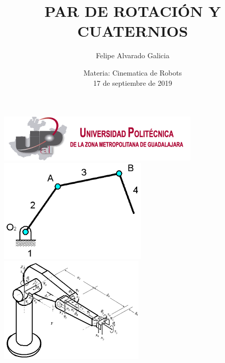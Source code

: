 \documentclass[12pt,a4paper]{article}
\author{Felipe Alvarado Galicia}
\title{PAR DE ROTACIÓN Y CUATERNIOS}
\date{Materia: Cinematica de Robots\\
17 de septiembre de 2019}
\begin{document}
\maketitle \includegraphics[scale=1]{logo1.png}\\
\includegraphics[scale=1]{imag5.png} 
\includegraphics[scale=1]{imag8.png}\\\\\\\\\\\\\\\\\\\\\\\\\\\\\\\\\\\\\\\\\\\\\\
\end{document}
